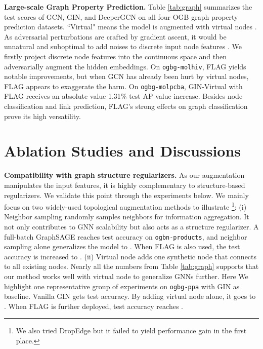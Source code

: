 \documentclass[11pt]{article}
\begin{document}
{\bf Large-scale Graph Property Prediction.} Table \ref{tab:graph} summarizes the test scores of GCN, GIN, and DeeperGCN on all four OGB graph property prediction datasets. ``Virtual" means the model is augmented with virtual nodes \citep{li2017learning,gilmer2017neural,hu2020open}. As adversarial perturbations are crafted by gradient ascent, it would be unnatural and suboptimal to add noises to discrete input node features \citep{zugner2018adversarial}. We firstly project discrete node features into the continuous space and then adversarially augment the hidden embeddings. On \texttt{ogbg-molhiv}, FLAG yields notable improvements, but when GCN has already been hurt by virtual nodes, FLAG appears to exaggerate the harm. On \texttt{ogbg-molpcba}, GIN-Virtual with FLAG receives an absolute value 1.31\% test AP value increase. Besides node classification and link prediction, FLAG's strong effects on graph classification prove its high versatility.


 \section{Ablation Studies and Discussions}\label{sec:ablate}

{\bf Compatibility with graph structure regularizers.} As our augmentation manipulates the input features, it is highly complementary to structure-based regularizers. We validate this point through the experiments below. We mainly focus on two widely-used topological augmentation methods to illustrate \footnote{We also tried DropEdge \citep{rong2019dropedge} but it failed to yield performance gain in the first place.}: (i) Neighbor sampling \citep{hamilton2017inductive} randomly samples neighbors for information aggregation. It not only contributes to GNN scalability but also acts as a structure regularizer. A full-batch GraphSAGE reaches  test accuracy on \texttt{ogbn-products}, and neighbor sampling alone generalizes the model to . When FLAG is also used, the test accuracy is increased to . (ii) Virtual node \citep{gilmer2017neural} adds one synthetic node that connects to all existing nodes. Nearly all the numbers from Table \ref{tab:graph} supports that our method works well with virtual node to generalize GNNs further. Here We highlight one representative group of experiments on \texttt{ogbg-ppa} with GIN as baseline. Vanilla GIN gets  test accuracy. By adding virtual node alone, it goes to . When FLAG is further deployed, test accuracy reaches . 
\end{document}
